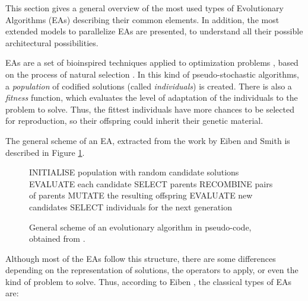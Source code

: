 \documentclass{article}
\begin{document}
This section gives a general overview of the most used types of
Evolutionary Algorithms (EAs) describing their common elements. In
addition, the most extended models to parallelize EAs are presented,
to understand all their possible architectural possibilities. 

EAs are a set of bioinspired techniques applied to optimization problems \cite{eiben2010whatis}, based on the process of natural selection \cite{darwin1859}. In this kind of pseudo-stochastic algorithms, a \textit{population} of codified solutions (called \textit{individuals}) is created. There is also a \textit{fitness} function, which evaluates the level of adaptation of the individuals to the problem to solve.
Thus, the fittest individuals have more chances to be selected for reproduction, so their offspring could inherit their genetic material.


The general scheme of an EA, extracted from the work by Eiben and Smith \cite{eiben2010whatis} is described in Figure \ref{fig:basicscheme}.

\begin{figure}[tb]
\begin{algorithmic}
\STATE INITIALISE population with random candidate solutions
\STATE EVALUATE each candidate
   SELECT parents
   RECOMBINE pairs of parents
   MUTATE the resulting offspring
   EVALUATE new candidates
   SELECT individuals for the next generation
\ENDWHILE
\end{algorithmic}
\caption{General scheme of an evolutionary algorithm in pseudo-code, obtained from \cite{eiben2010whatis}.}
\label{fig:basicscheme}
\end{figure}


Although most of the EAs follow this structure, there are some differences depending on the representation of solutions, the operators to apply, or even the kind of problem to solve. Thus, according to Eiben \cite{eiben2010whatis}, the classical types of EAs are:

\end{document}

